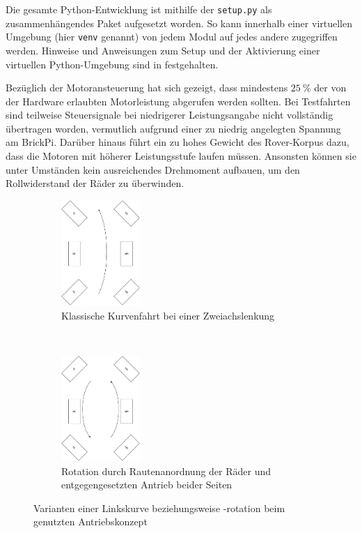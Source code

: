 Die gesamte Python-Entwicklung ist mithilfe der \texttt{setup.py} als zusammenhängendes Paket aufgesetzt worden.
So kann innerhalb einer virtuellen Umgebung (hier \texttt{venv} genannt) von jedem Modul auf jedes andere zugegriffen werden.
Hinweise und Anweisungen zum Setup und der Aktivierung einer virtuellen Python-Umgebung sind in \cite{langtangen2016} festgehalten.

Bezüglich der Motoransteuerung hat sich gezeigt, dass mindestens $25\ \%$ der von der Hardware erlaubten Motorleistung abgerufen werden sollten.
Bei Testfahrten sind teilweise Steuersignale bei niedrigerer Leistungsangabe nicht vollständig übertragen worden, vermutlich aufgrund einer zu niedrig angelegten Spannung am BrickPi.
Darüber hinaus führt ein zu hohes Gewicht des Rover-Korpus dazu, dass die Motoren mit höherer Leistungsstufe laufen müssen.
Ansonsten können sie unter Umständen kein ausreichendes Drehmoment aufbauen, um den Rollwiderstand der Räder zu überwinden.

\begin{figure}
	\centering
	\begin{subfigure}[t]{0.4\textwidth}
		\centering
		\includegraphics[height=4cm]{../Images/kurve.pdf}
		\caption{Klassische Kurvenfahrt bei einer Zweiachslenkung}
		\label{subfig:kurve}
	\end{subfigure}
	~
	\begin{subfigure}[t]{0.4\textwidth}
		\centering
		\includegraphics[height=4cm]{../Images/rotate.pdf}
		\caption{Rotation durch Rautenanordnung der Räder und entgegengesetzten Antrieb beider Seiten}
		\label{subfig:rotation}
	\end{subfigure}
	\caption{Varianten einer Linkskurve beziehungsweise -rotation beim genutzten Antriebskonzept}
	\label{fig:moveleft}
\end{figure}

